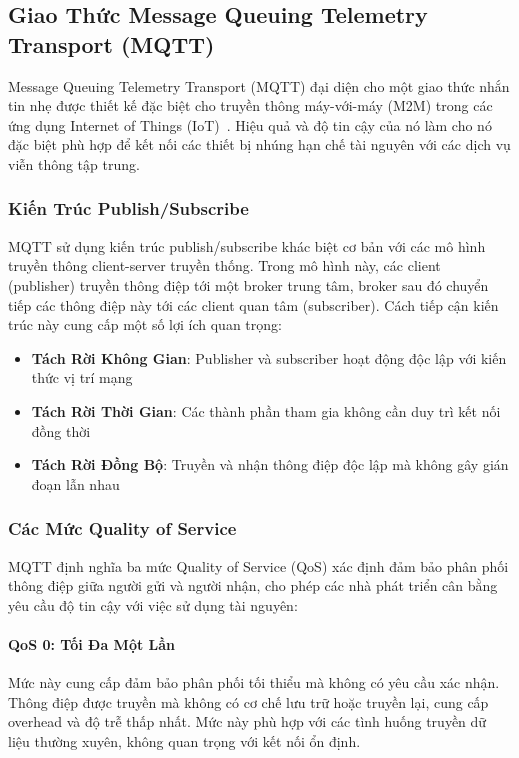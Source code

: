\subsection{Giao Thức Message Queuing Telemetry Transport (MQTT)}
\label{subsec:mqtt_protocol}

Message Queuing Telemetry Transport (MQTT) đại diện cho một giao thức nhắn tin nhẹ được thiết kế đặc biệt cho truyền thông máy-với-máy (M2M) trong các ứng dụng Internet of Things (IoT)~\cite{mqtt_oasis_standard}. Hiệu quả và độ tin cậy của nó làm cho nó đặc biệt phù hợp để kết nối các thiết bị nhúng hạn chế tài nguyên với các dịch vụ viễn thông tập trung.

\subsubsection{Kiến Trúc Publish/Subscribe}
\label{subsubsec:mqtt_pubsub}

MQTT sử dụng kiến trúc publish/subscribe khác biệt cơ bản với các mô hình truyền thông client-server truyền thống. Trong mô hình này, các client (publisher) truyền thông điệp tới một broker trung tâm, broker sau đó chuyển tiếp các thông điệp này tới các client quan tâm (subscriber). Cách tiếp cận kiến trúc này cung cấp một số lợi ích quan trọng:

\begin{itemize}
    \item \textbf{Tách Rời Không Gian}: Publisher và subscriber hoạt động độc lập với kiến thức vị trí mạng
    \item \textbf{Tách Rời Thời Gian}: Các thành phần tham gia không cần duy trì kết nối đồng thời
    \item \textbf{Tách Rời Đồng Bộ}: Truyền và nhận thông điệp độc lập mà không gây gián đoạn lẫn nhau
\end{itemize}

\subsubsection{Các Mức Quality of Service}
\label{subsubsec:mqtt_qos}

MQTT định nghĩa ba mức Quality of Service (QoS) xác định đảm bảo phân phối thông điệp giữa người gửi và người nhận, cho phép các nhà phát triển cân bằng yêu cầu độ tin cậy với việc sử dụng tài nguyên:

\paragraph{QoS 0: Tối Đa Một Lần}
Mức này cung cấp đảm bảo phân phối tối thiểu mà không có yêu cầu xác nhận. Thông điệp được truyền mà không có cơ chế lưu trữ hoặc truyền lại, cung cấp overhead và độ trễ thấp nhất. Mức này phù hợp với các tình huống truyền dữ liệu thường xuyên, không quan trọng với kết nối ổn định.

